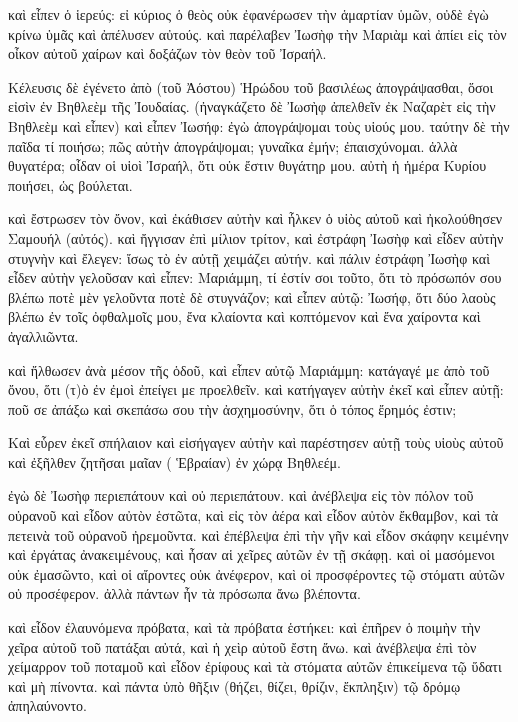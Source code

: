 \pend\pstart
καὶ εἶπεν ὁ ἱερεύς: εἰ κύριος ὁ θεὸς οὐκ ἐφανέρωσεν τὴν ἁμαρτίαν ὑμῶν, οὐδὲ ἐγὼ κρίνω ὑμᾶς καὶ ἀπέλυσεν αὐτούς. καὶ παρέλαβεν Ἰωσὴφ τὴν Μαριὰμ καὶ ἀπίει εἰς τὸν οἶκον αὐτοῦ χαίρων καὶ δοξάζων τὸν θεὸν τοῦ Ἰσραήλ.

\pend\pstart
{}

\pend\pstart
Κέλευσις δὲ ἐγένετο ἀπὸ (τοῦ Ἀόστου) Ἡρώδου τοῦ βασιλέως ἀπογράψασθαι, ὅσοι εἰσὶν ἐν Βηθλεὲμ τῆς Ἰουδαίας. (ἠναγκάζετο δὲ Ἰωσὴφ ἀπελθεῖν ἐκ Ναζαρὲτ εἰς τὴν Βηθλεὲμ καὶ εἶπεν) καὶ εἶπεν Ἰωσήφ: ἐγὼ ἀπογράψομαι τοὺς υἱούς μου. ταύτην δὲ τὴν παῖδα τί ποιήσω; πῶς αὐτὴν ἀπογράψομαι; γυναῖκα ἐμήν; ἐπαισχύνομαι. ἀλλὰ θυγατέρα; οἶδαν οἱ υἱοὶ Ἰσραήλ, ὅτι οὐκ ἔστιν θυγάτηρ μου. αὐτὴ ἡ ἡμέρα Κυρίου ποιήσει, ὡς βούλεται.

\pend\pstart
καὶ ἔστρωσεν τὸν ὄνον, καὶ ἐκάθισεν αὐτὴν καὶ ἧλκεν ὁ υἱὸς αὐτοῦ καὶ ἠκολούθησεν Σαμουήλ (αὐτός). καὶ ἤγγισαν ἐπὶ μίλιον τρίτον, καὶ ἐστράφη Ἰωσὴφ καὶ εἶδεν αὐτὴν στυγνὴν καὶ ἔλεγεν: ἴσως τὸ ἐν αὐτῇ χειμάζει αὐτήν. καὶ πάλιν ἐστράφη Ἰωσὴφ καὶ εἶδεν αὐτὴν γελοῦσαν καὶ εἶπεν: Μαριάμμη, τί ἐστίν σοι τοῦτο, ὅτι τὸ πρόσωπόν σου βλέπω ποτὲ μὲν γελοῦντα ποτὲ δὲ στυγνάζον; καὶ εἶπεν αὐτῷ: Ἰωσήφ, ὅτι δύο λαοὺς βλέπω ἐν τοῖς ὀφθαλμοῖς μου, ἔνα κλαίοντα καὶ κοπτόμενον καὶ ἔνα χαίροντα καὶ ἀγαλλιῶντα.

\pend\pstart
καὶ ἤλθωσεν ἀνὰ μέσον τῆς ὁδοῦ, καὶ εἶπεν αὐτῷ Μαριάμμη: κατάγαγέ με ἀπὸ τοῦ ὄνου, ὅτι (τ)ὸ ἐν ἐμοὶ ἐπείγει με προελθεῖν. καὶ κατήγαγεν αὐτὴν ἐκεῖ καὶ εἶπεν αὐτῇ: ποῦ σε ἀπάξω καὶ σκεπάσω σου τὴν ἀσχημοσύνην, ὅτι ὁ τόπος ἔρημός ἐστιν;

\pend\pstart
{}

\pend\pstart
Καὶ εὗρεν ἐκεῖ σπήλαιον καὶ εἰσήγαγεν αὐτὴν καὶ παρέστησεν αὐτῇ τοὺς υἱοὺς αὐτοῦ καὶ ἐξῆλθεν ζητῆσαι μαῖαν ( Ἑβραίαν) ἐν χώρᾳ Βηθλεέμ.

\pend\pstart
ἐγὼ δὲ Ἰωσὴφ περιεπάτουν καὶ οὐ περιεπάτουν. καὶ ἀνέβλεψα εἰς τὸν πόλον τοῦ οὐρανοῦ καὶ εἶδον αὐτὸν ἑστῶτα, καὶ εἰς τὸν ἀέρα καὶ εἶδον αὐτὸν ἔκθαμβον, καὶ τὰ πετεινὰ τοῦ οὐρανοῦ ἠρεμοῦντα. καὶ ἐπέβλεψα ἐπὶ τὴν γῆν καὶ εἶδον σκάφην κειμένην καὶ ἐργάτας ἀνακειμένους, καὶ ἦσαν αἱ χεῖρες αὐτῶν ἐν τῇ σκάφῃ. καὶ οἱ μασόμενοι οὐκ ἐμασῶντο, καὶ οἱ αἴροντες οὐκ ἀνέφερον, καὶ οἱ προσφέροντες τῷ στόματι αὐτῶν οὐ προσέφερον. ἀλλὰ πάντων ἦν τὰ πρόσωπα ἄνω βλέποντα.

\pend\pstart
καὶ εἶδον ἐλαυνόμενα πρόβατα, καὶ τὰ πρόβατα ἑστήκει: καὶ ἐπῆρεν ὁ ποιμὴν τὴν χεῖρα αὐτοῦ τοῦ πατάξαι αὐτά, καὶ ἡ χεὶρ αὐτοῦ ἔστη ἄνω. καὶ ἀνέβλεψα ἐπὶ τὸν χείμαρρον τοῦ ποταμοῦ καὶ εἶδον ἐρίφους καὶ τὰ στόματα αὐτῶν ἐπικείμενα τῷ ὕδατι καὶ μὴ πίνοντα. καὶ πάντα ὑπὸ θῆξιν (θήζει, θίζει, θρίζιν, ἔκπληξιν) τῷ δρόμῳ ἀπηλαύνοντο.

\pend\pstart
{}

\pend
